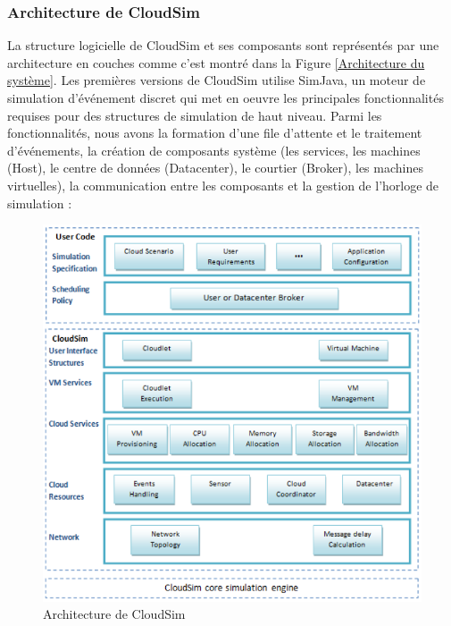 \subsubsection{Architecture de CloudSim}
\begin{onehalfspace}
La structure logicielle de CloudSim et ses composants sont représentés par une architecture en couches comme c'est montré dans la Figure \ref{Architecture du système}. Les premières versions de CloudSim utilise SimJava, un moteur de simulation d'événement discret qui met en oeuvre les principales fonctionnalités requises pour des structures de simulation de haut niveau. Parmi les fonctionnalités, nous avons la formation d'une file d'attente et le traitement d'événements, la création de composants système (les services, les machines (Host), le centre de données (Datacenter), le courtier (Broker), les machines virtuelles), la communication entre les composants et la gestion de l'horloge de simulation :

\begin{figure}[!h]
\begin{center}
\includegraphics[scale=0.5]{figures/5.png} 
\end{center}
\caption{Architecture de CloudSim \cite{ref41}}
\label{ArchitecturedeCloudSim}
\end{figure}

\end{onehalfspace}


